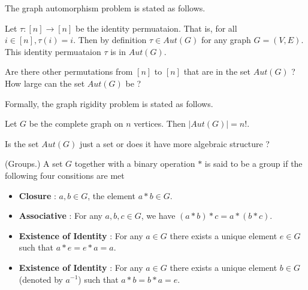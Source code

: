 The graph automorphism problem is stated as follows. 
\begin{center}
\end{center}



\begin{obs}
Let $\tau:[n]\rightarrow[n]$ be the identity permuataion. That is, for all $i\in[n],\tau(i)=i$. Then by definition $\tau\in Aut(G)$ for any graph $G=(V,E)$. This identity permuataion $\tau$ is in $Aut(G)$. 
\end{obs}


Are there other permutations from $[n]$ to $[n]$ that are in the set $Aut(G)$ ? How large can the set $Aut(G)$ be ?

Formally, the graph rigidity problem is stated as follows.
\begin{center}
\end{center}

\begin{obs}
Let $G$ be the complete graph on $n$ vertices. Then $|Aut(G)|=n!$.  
\end{obs}

Is the set $Aut(G)$ just a set or does it have more algebraic structure ? 

\begin{defn}(Groups.)
A set $G$ together with a binary operation $*$ is said to be a group if the following four consitions are met
\begin{itemize}
\item \textbf{Closure} : $a,b\in G$, the element $a*b\in G$.
\item \textbf{Associative} : For any $a,b,c\in G$, we have $(a*b)*c = a*(b*c)$.
\item \textbf{Existence of Identity} : For any $a\in G$ there exists a unique element $e\in G$ such that $a*e =e*a =a$. 
\item \textbf{Existence of Identity} : For any $a\in G$ there exists a unique element $b\in G$(denoted by $a^{-1}$) such that $a*b =b*a =e$. 
\end{itemize}
\end{defn}

